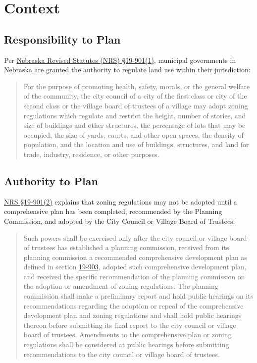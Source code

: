 \section{Context}

\subsection*{Responsibility to Plan}

\noindent Per \href{https://nebraskalegislature.gov/laws/statutes.php?statute=19-901}{Nebraska Revised Statutes (NRS) \S 19-901(1)}, municipal governments in Nebraska are granted the authority to regulate land use within their jurisdiction:

\begin{quote}
    For the purpose of promoting health, safety, morals, or the general welfare of the community, the city council of a city of the first class or city of the second class or the village board of trustees of a village may adopt zoning regulations which regulate and restrict the height, number of stories, and size of buildings and other structures, the percentage of lots that may be occupied, the size of yards, courts, and other open spaces, the density of population, and the location and use of buildings, structures, and land for trade, industry, residence, or other purposes.
\end{quote}

\subsection*{Authority to Plan}

\noindent \href{https://nebraskalegislature.gov/laws/statutes.php?statute=19-901}{NRS \S 19-901(2)} explains that zoning regulations may not be adopted until a comprehensive plan has been completed, recommended by the Planning Commission, and adopted by the City Council or Village Board of Trustees:

\begin{quote}
    Such powers shall be exercised only after the city council or village board of trustees has established a planning commission, received from its planning commission a recommended comprehensive development plan as defined in section \href{https://nebraskalegislature.gov/laws/statutes.php?statute=19-903}{19-903}, adopted such comprehensive development plan, and received the specific recommendation of the planning commission on the adoption or amendment of zoning regulations. The planning commission shall make a preliminary report and hold public hearings on its recommendations regarding the adoption or repeal of the comprehensive development plan and zoning regulations and shall hold public hearings thereon before submitting its final report to the city council or village board of trustees. Amendments to the comprehensive plan or zoning regulations shall be considered at public hearings before submitting recommendations to the city council or village board of trustees.
\end{quote}

